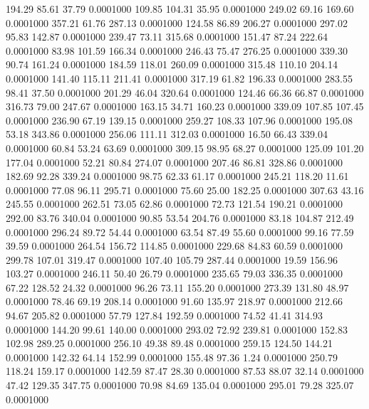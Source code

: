  194.29   85.61   37.79   0.0001000
 109.85  104.31   35.95   0.0001000
 249.02   69.16  169.60   0.0001000
 357.21   61.76  287.13   0.0001000
 124.58   86.89  206.27   0.0001000
 297.02   95.83  142.87   0.0001000
 239.47   73.11  315.68   0.0001000
 151.47   87.24  222.64   0.0001000
  83.98  101.59  166.34   0.0001000
 246.43   75.47  276.25   0.0001000
 339.30   90.74  161.24   0.0001000
 184.59  118.01  260.09   0.0001000
 315.48  110.10  204.14   0.0001000
 141.40  115.11  211.41   0.0001000
 317.19   61.82  196.33   0.0001000
 283.55   98.41   37.50   0.0001000
 201.29   46.04  320.64   0.0001000
 124.46   66.36   66.87   0.0001000
 316.73   79.00  247.67   0.0001000
 163.15   34.71  160.23   0.0001000
 339.09  107.85  107.45   0.0001000
 236.90   67.19  139.15   0.0001000
 259.27  108.33  107.96   0.0001000
 195.08   53.18  343.86   0.0001000
 256.06  111.11  312.03   0.0001000
  16.50   66.43  339.04   0.0001000
  60.84   53.24   63.69   0.0001000
 309.15   98.95   68.27   0.0001000
 125.09  101.20  177.04   0.0001000
  52.21   80.84  274.07   0.0001000
 207.46   86.81  328.86   0.0001000
 182.69   92.28  339.24   0.0001000
  98.75   62.33   61.17   0.0001000
 245.21  118.20   11.61   0.0001000
  77.08   96.11  295.71   0.0001000
  75.60   25.00  182.25   0.0001000
 307.63   43.16  245.55   0.0001000
 262.51   73.05   62.86   0.0001000
  72.73  121.54  190.21   0.0001000
 292.00   83.76  340.04   0.0001000
  90.85   53.54  204.76   0.0001000
  83.18  104.87  212.49   0.0001000
 296.24   89.72   54.44   0.0001000
  63.54   87.49   55.60   0.0001000
  99.16   77.59   39.59   0.0001000
 264.54  156.72  114.85   0.0001000
 229.68   84.83   60.59   0.0001000
 299.78  107.01  319.47   0.0001000
 107.40  105.79  287.44   0.0001000
  19.59  156.96  103.27   0.0001000
 246.11   50.40   26.79   0.0001000
 235.65   79.03  336.35   0.0001000
  67.22  128.52   24.32   0.0001000
  96.26   73.11  155.20   0.0001000
 273.39  131.80   48.97   0.0001000
  78.46   69.19  208.14   0.0001000
  91.60  135.97  218.97   0.0001000
 212.66   94.67  205.82   0.0001000
  57.79  127.84  192.59   0.0001000
  74.52   41.41  314.93   0.0001000
 144.20   99.61  140.00   0.0001000
 293.02   72.92  239.81   0.0001000
 152.83  102.98  289.25   0.0001000
 256.10   49.38   89.48   0.0001000
 259.15  124.50  144.21   0.0001000
 142.32   64.14  152.99   0.0001000
 155.48   97.36    1.24   0.0001000
 250.79  118.24  159.17   0.0001000
 142.59   87.47   28.30   0.0001000
  87.53   88.07   32.14   0.0001000
  47.42  129.35  347.75   0.0001000
  70.98   84.69  135.04   0.0001000
 295.01   79.28  325.07   0.0001000
